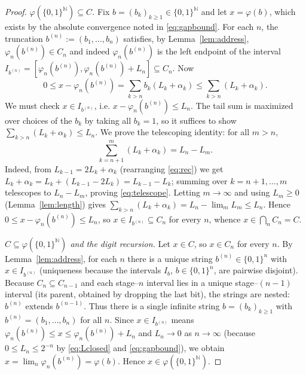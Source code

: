 \documentclass[11pt]{article}
\theoremstyle{definition}
\theoremstyle{remark}
\begin{document}
\begin{proof}
\emph{$\varphi(\{0,1\}^{\mathbb N})\subseteq C$.} Fix
$b=(b_k)_{k\ge1}\in\{0,1\}^{\mathbb N}$ and let $x=\varphi(b)$, which exists by the
absolute convergence noted in \eqref{eq:gapbound}. For each $n$, the truncation
$b^{(n)}:=(b_1,\dots,b_n)$ satisfies, by Lemma~\ref{lem:address},
$\varphi_n(b^{(n)})\in C_n$ and indeed
$\varphi_n(b^{(n)})$ is the left endpoint of the interval
$I_{b^{(n)}}=[\varphi_n(b^{(n)}),\varphi_n(b^{(n)})+L_n]\subseteq C_n$. Now
\[
0\le x-\varphi_n(b^{(n)})=\sum_{k>n}b_k(L_k+\alpha_k)
\le\sum_{k>n}(L_k+\alpha_k).
\]
We must check $x\in I_{b^{(n)}}$, i.e. $x-\varphi_n(b^{(n)})\le L_n$. The tail
sum is maximized over choices of the $b_k$ by taking all $b_k=1$, so it suffices
to show $\sum_{k>n}(L_k+\alpha_k)\le L_n$. We prove the telescoping identity: for
all $m>n$,
\begin{equation}\label{eq:telescope}
\sum_{k=n+1}^{m}(L_k+\alpha_k)=L_n-L_m .
\end{equation}
Indeed, from $L_{k-1}=2L_k+\alpha_k$ (rearranging \eqref{eq:rec}) we get
$L_k+\alpha_k=L_k+(L_{k-1}-2L_k)=L_{k-1}-L_k$; summing over $k=n+1,\dots,m$
telescopes to $L_n-L_m$, proving \eqref{eq:telescope}. Letting $m\to\infty$ and
using $L_m\ge0$ (Lemma~\ref{lem:length}) gives
$\sum_{k>n}(L_k+\alpha_k)=L_n-\lim_m L_m\le L_n$. Hence
$0\le x-\varphi_n(b^{(n)})\le L_n$, so $x\in I_{b^{(n)}}\subseteq C_n$ for every
$n$, whence $x\in\bigcap_n C_n=C$.

\medskip\noindent
\emph{$C\subseteq\varphi(\{0,1\}^{\mathbb N})$ and the digit recursion.} Let
$x\in C$, so $x\in C_n$ for every $n$. By Lemma~\ref{lem:address}, for each $n$
there is a unique string $b^{(n)}\in\{0,1\}^{n}$ with $x\in I_{b^{(n)}}$
(uniqueness because the intervals $I_b$, $b\in\{0,1\}^n$, are pairwise disjoint).
Because $C_{n}\subseteq C_{n-1}$ and each stage--$n$ interval lies in a unique
stage--$(n-1)$ interval (its parent, obtained by dropping the last bit), the
strings are nested: $b^{(n)}$ extends $b^{(n-1)}$. Thus there is a single
infinite string $b=(b_k)_{k\ge1}$ with $b^{(n)}=(b_1,\dots,b_n)$ for all $n$.
Since $x\in I_{b^{(n)}}$ means $\varphi_n(b^{(n)})\le x\le\varphi_n(b^{(n)})+L_n$
and $L_n\to 0$ as $n\to\infty$ (because $0\le L_n\le 2^{-n}$ by
\eqref{eq:Lclosed} and \eqref{eq:gapbound}), we obtain
$x=\lim_n\varphi_n(b^{(n)})=\varphi(b)$. Hence $x\in\varphi(\{0,1\}^{\mathbb N})$.


\end{proof}
\end{document}
